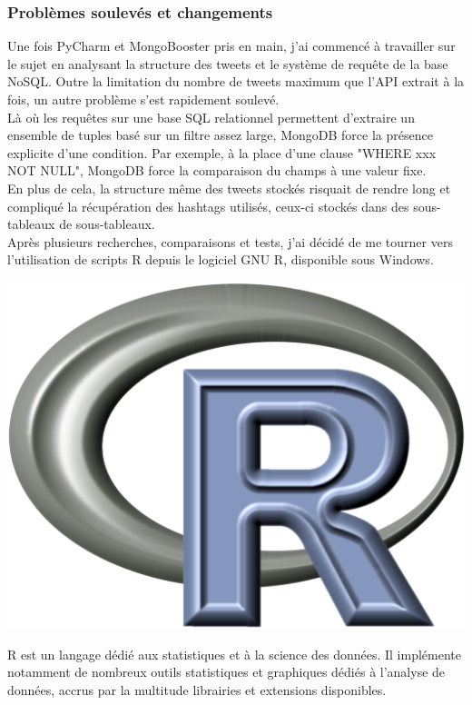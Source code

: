 \documentclass[a4paper,12pt]{article}
\begin{document}
\subsubsection{Problèmes soulevés et changements}
Une fois PyCharm et MongoBooster pris en main, j'ai commencé à travailler sur le sujet en analysant la structure des tweets et le système de requête de la base NoSQL. Outre la limitation du nombre de tweets maximum que l'API extrait à la fois, un autre problème s'est rapidement soulevé.\\
Là où les requêtes sur une base SQL relationnel permettent d'extraire un ensemble de tuples basé sur un filtre assez large, MongoDB force la présence explicite d'une condition. Par exemple, à la place d'une clause "WHERE xxx NOT NULL", MongoDB force la comparaison du champs à une valeur fixe. \\
En plus de cela, la structure même des tweets stockés risquait de rendre long et compliqué la récupération des hashtags utilisés, ceux-ci stockés dans des sous-tableaux de sous-tableaux. \\

Après plusieurs recherches, comparaisons et tests, j'ai décidé de me tourner vers l'utilisation de scripts R depuis le logiciel GNU R, disponible sous Windows. \\

\begin{center}
    \includegraphics[scale=0.25]{illustrations/r-logo}
\end{center}

R est un langage dédié aux statistiques et à la science des données. Il implémente notamment de nombreux outils statistiques et graphiques dédiés à l'analyse de données, accrus par la multitude librairies et extensions disponibles. \\
\end{document}

